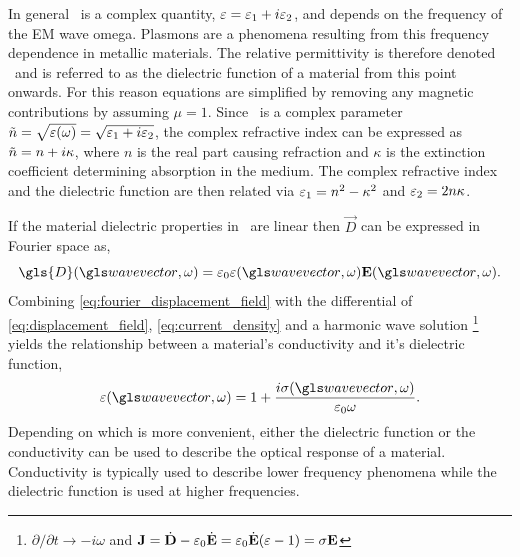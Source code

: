 \documentclass{article}
\begin{document}
In general \eps\ is a complex quantity, $\varepsilon=\varepsilon_1+i\varepsilon_2$, and depends on the frequency of the EM wave \gls{omega}. Plasmons are a phenomena resulting from this frequency dependence in metallic materials. The relative permittivity is therefore denoted \dielectric\ and is referred to as the dielectric function of a material from this point onwards. For this reason equations are simplified by removing any magnetic contributions by assuming $\mu=1$.
Since \dielectric\ is a complex parameter $\tilde{n}=\sqrt{\varepsilon(\omega)}=\sqrt{\varepsilon_1+i\varepsilon_2}$, the complex refractive index can be expressed as $\tilde{n}=n+i\kappa$, where $n$ is the real part causing refraction and $\kappa$ is the extinction coefficient determining absorption in the medium. The complex refractive index and the dielectric function are then related via $\varepsilon_1=n^2-\kappa^2$ and $\varepsilon_2 = 2n\kappa$.

If the material dielectric properties in \eps\ are linear then $\vec{D}$ can be expressed in Fourier space as,
\begin{equation}
	\gls{D}(\wv, \omega) = \epsfs\eps(\wv, \omega)\vec{E}(\wv, \omega).
	\label{eq:fourier_displacement_field}
\end{equation}
Combining \eqref{eq:fourier_displacement_field} with the differential of \eqref{eq:displacement_field}, \eqref{eq:current_density} and a harmonic wave solution%
\footnote{$\partial/\partial t \rightarrow -i\omega$ and $\mathbf{J}=\dot{\mathbf{D}}-\varepsilon_0\dot{\mathbf{E}}=\varepsilon_0\dot{\mathbf{E}}(\varepsilon-1)=\sigma\mathbf{E}$}
yields the relationship between a material's conductivity and it's dielectric function,
\begin{equation}
	\eps(\wv, \omega) = 1 + \frac{i\sigma(\wv, \omega)}{\epsfs\omega}.
	\label{eq:dielectric_conductivity}
\end{equation}
Depending on which is more convenient, either the dielectric function or the conductivity can be used to describe the optical response of a material. Conductivity is typically used to describe lower frequency phenomena while the dielectric function is used at higher frequencies.
\end{document}
